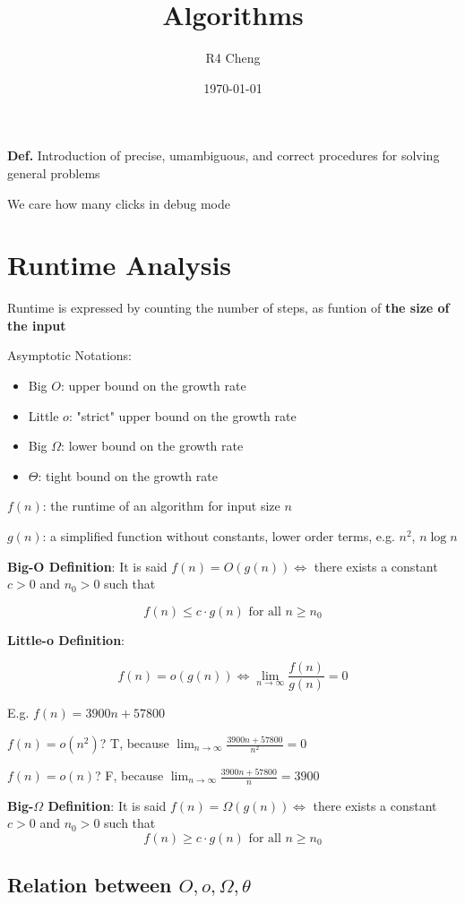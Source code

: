 \documentclass[12pt,a4paper]{article}
\title{Algorithms}
\author{R4 Cheng}
\date{\today}
\begin{document}
\maketitle

\textbf{Def.} Introduction of precise, umambiguous, and correct procedures for solving general problems

We care how many clicks in debug mode

\section*{Runtime Analysis}

Runtime is expressed by counting the number of steps, as funtion of \textbf{the size of the input}

Asymptotic Notations:

\begin{itemize}
  \item Big $O$: upper bound on the growth rate
  \item Little $o$: "strict" upper bound on the growth rate
  \item Big $\Omega$: lower bound on the growth rate
  \item $\Theta$: tight bound on the growth rate
\end{itemize}

$f(n)$: the runtime of an algorithm for input size $n$

$g(n)$: a simplified function without constants, lower order terms, e.g. $n^2$, $n \log n$

\textbf{Big-O Definition}: It is said $f(n) = O(g(n)) \iff$ there exists a constant $c > 0$ and $n_0 > 0$ such that

\[f(n) \leq c \cdot g(n) \text{ for all } n \geq n_0\]

\textbf{Little-o Definition}:

\[f(n) = o(g(n)) \iff \lim_{n \to \infty} \frac{f(n)}{g(n)} = 0\]

E.g. $f(n) = 3900n + 57800$

$f(n) = o(n^2)$? T, because $\lim_{n \to \infty} \frac{3900n + 57800}{n^2} = 0$

$f(n) = o(n)$? F, because $\lim_{n \to \infty} \frac{3900n + 57800}{n} = 3900$

\textbf{Big-$\Omega$ Definition}: It is said $f(n) = \Omega(g(n)) \iff$ there exists a constant $c > 0$ and $n_0 > 0$ such that
$$f(n) \geq c \cdot g(n) \text{ for all } n \geq n_0$$

\subsection*{Relation between $O,o,\Omega,\theta$}
\end{document}
